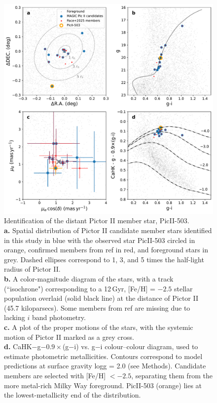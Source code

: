 \documentclass[pdflatex,sn-nature]{sn-jnl}%
\theoremstyle{thmstyleone}%
\theoremstyle{thmstyletwo}%
\theoremstyle{thmstylethree}%
\begin{document}
\begin{figure}[h]
\centering
\includegraphics[width=1.0\textwidth]{f1.pdf}
\caption{Identification of the distant Pictor II member star, PicII-503.\\
\textbf{a.} Spatial distribution of Pictor II candidate member stars identified in this study in blue with the observed star PicII-503 circled in orange, confirmed members from ref\cite{pace+25} in red, and foreground stars in grey. 
Dashed ellipses correspond to 1, 3, and 5 times the half-light radius of Pictor II\cite{pace+25}.\\
\textbf{b.} A color-magnitude diagram of the stars, with a track (``isochrone") corresponding to a 12\,Gyr, [Fe/H] = $-2.5$ stellar population\cite{dcj+08} overlaid (solid black line) at the distance of Pictor II (45.7 kiloparsecs)\cite{pace+25}.
Some members from ref\cite{pace+25} are missing due to lacking $i$ band photometry.\\
\textbf{c.} A plot of the proper motions of the stars, with the systemic motion of Pictor II marked as a grey cross\cite{btt+22}. \\
\textbf{d.} %
CaHK$-$g$-0.9\times$(g$-$i) vs. g$-$i colour–colour diagram, used to estimate photometric metallicities. 
Contours correspond to model predictions at surface gravity logg = 2.0 (see Methods). Candidate members are selected with [Fe/H] $< -2.5$, separating them from the more metal-rich Milky Way foreground. PicII-503 (orange) lies at the lowest-metallicity end of the distribution.
}
\label{fig:selection}
\end{figure}
\end{document}
